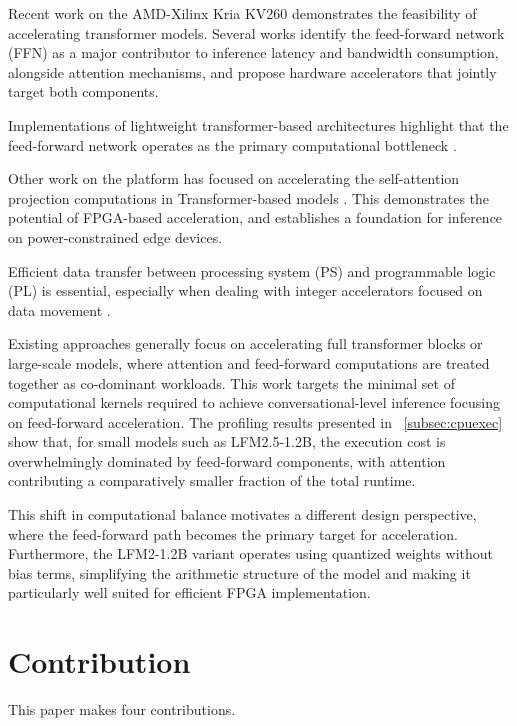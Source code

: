 \documentclass[conference]{IEEEtran}
\begin{document}
Recent work on the AMD-Xilinx Kria KV260 demonstrates the feasibility of accelerating transformer models. Several works identify the feed-forward network (FFN) as a major contributor to inference latency and bandwidth consumption, alongside attention mechanisms, and propose hardware accelerators that jointly target both components.

Implementations of lightweight transformer-based architectures highlight that the feed-forward network operates as the primary computational bottleneck \cite{11310944tin}.

Other work on the platform has focused on accelerating the self-attention projection computations in Transformer-based models \cite{li2025fpgabasedhardware}. This  demonstrates the potential of FPGA-based acceleration, and establishes a foundation for inference on power-constrained edge devices.

Efficient data transfer between processing system (PS) and programmable logic (PL) is essential, especially when dealing with integer accelerators focused on data movement \cite{11311069}.

Existing approaches generally focus on accelerating full transformer blocks or large-scale models, where attention and feed-forward computations are treated together as co-dominant workloads. 
This work targets the minimal set of computational kernels required to achieve conversational-level inference focusing on feed-forward acceleration.
The profiling results presented in  ~\ref{subsec:cpuexec} show that, for small models such as LFM2.5-1.2B, the execution cost is overwhelmingly dominated by feed-forward components, with attention contributing a comparatively smaller fraction of the total runtime. 

This shift in computational balance motivates a different design perspective, where the feed-forward path becomes the primary target for acceleration.
Furthermore, the LFM2-1.2B variant operates using quantized weights without bias terms, simplifying the arithmetic structure of the model and making it particularly well suited for efficient FPGA implementation.


\section{Contribution}\label{sec:contribution}
This paper makes four contributions.
\end{document}
